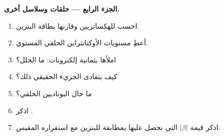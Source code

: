 \begin{problem}
\medskip
\noindent\textbf{الجزء الرابع --- حلقات وسلاسل أخرى.}
\begin{enumerate}[resume]
  \item احسب  للهكساتريين وقارنها بطاقة البنزين.
  \item أعطِ مستويات الأوكتاتتراين الحلقي المستوي.
  \item املأها بثمانية إلكترونات: ما الخلل؟
  \item كيف يتفادى الجزيء الحقيقي ذلك؟
  \item ما حال البوتاديين الحلقي؟
  \item اذكر .
  \item اذكر قيمة $|\beta|$ التي نحصل عليها بمطابقة  للبنزين
        مع استقراره المقيس.
\end{enumerate}
\end{problem}
